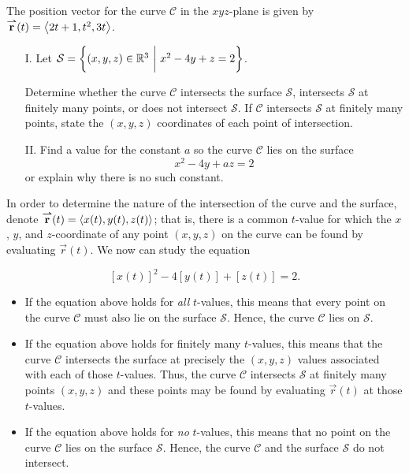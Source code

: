 \documentclass[noauthor, handout]{ximera}
\begin{document}
\begin{problem}
The position vector for the curve $\mathcal{C}$ in the $xyz$-plane is given by ${\overset{\boldsymbol{\rightharpoonup}}{\mathbf{r}}} (t) = \left\langle 2t+1, t^2, 3t\right\rangle$.

\begin{itemize}
\item[I.] Let $\mathcal{S} = \left\{(x,y,z) \in \mathbb R^3 ~ \bigg| ~ x^2-4y + z = 2\right\}$.  

Determine whether the curve $\mathcal{C}$ intersects the surface $\mathcal{S}$, intersects $\mathcal{S}$ at finitely many points, or does not intersect $\mathcal{S}$.  If $\mathcal{C}$ intersects $\mathcal{S}$ at finitely many points, state the $(x,y,z)$ coordinates of each point of intersection. 
\item[II.] Find a value for the constant $a$ so the curve $\mathcal{C}$ lies on the surface $$x^2-4y + az = 2$$ or explain why there is no such constant.

\end{itemize}


\begin{freeResponse}
In order to determine the nature of the intersection of the curve and the surface, denote ${\overset{\boldsymbol{\rightharpoonup}}{\mathbf{r}}} (t) = \left\langle x(t), y(t) , z(t)\right\rangle$; that is, there is a common $t$-value for which the $x$, $y$, and $z$-coordinate of any point $(x,y,z)$ on the curve can be found by evaluating $\vec{r}(t)$. We now can study the equation

\[
[x(t)]^2-4[y(t)] + [z(t)] = 2.
\]

\begin{itemize}
\item If the equation above holds for \emph{all} $t$-values, this means that every point on the curve $\mathcal{C}$ must also lie on the surface $\mathcal{S}$. Hence, the curve $\mathcal{C}$ lies on $\mathcal{S}$.
\item If the equation above holds for finitely many $t$-values, this means that the curve $\mathcal{C}$ intersects the surface at precisely  the $(x,y,z)$ values associated with each of those $t$-values. Thus, the curve $\mathcal{C}$ intersects $\mathcal{S}$ at finitely many points $(x,y,z)$ and these points may be found by evaluating $\vec{r}(t)$ at those $t$-values.
\item If the equation above holds for \emph{no} $t$-values, this means that no point on the curve $\mathcal{C}$ lies on the surface $\mathcal{S}$. Hence, the curve $\mathcal{C}$ and the surface $\mathcal{S}$ do not intersect.
\end{itemize}


\end{freeResponse}
\end{problem}
\end{document}
